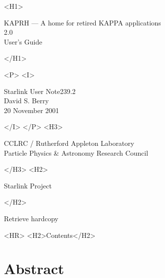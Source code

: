 \documentclass[twoside,11pt]{article}
\newcommand{\stardoccategory}  {Starlink User Note}
\newcommand{\stardocsource}    {sun239.2}
\newcommand{\stardocnumber}    {239.2}
\newcommand{\stardocauthors}   {David S. Berry}
\newcommand{\stardocdate}      {20 November 2001}
\newcommand{\stardoctitle}     {KAPRH ---  A home for retired KAPPA applications}
\newcommand{\stardocversion}   {2.0}
\newcommand{\stardocmanual}    {User's Guide}
\newcommand{\htmladdnormallink}[2]{#1}
\newcommand{\htmladdimg}[1]{}
\newcommand{\htmlref}[2]{#1}
\newcommand{\htmladdtonavigation}[1]{}
\newcommand{\xlabel}[1]{}
\newcommand{\latexonlytoc}[0]{\tableofcontents}
\begin{document}
\begin{htmlonly}
   \xlabel{}
   \begin{rawhtml} <H1> \end{rawhtml}
      \stardoctitle\\
      \stardocversion\\
      \stardocmanual
   \begin{rawhtml} </H1> \end{rawhtml}


   \begin{rawhtml} <P> <I> \end{rawhtml}
   \stardoccategory \stardocnumber \\
   \stardocauthors \\
   \stardocdate
   \begin{rawhtml} </I> </P> <H3> \end{rawhtml}
      \htmladdnormallink{CCLRC}{http://www.cclrc.ac.uk} /
      \htmladdnormallink{Rutherford Appleton Laboratory}
                        {http://www.cclrc.ac.uk/ral} \\
      \htmladdnormallink{Particle Physics \& Astronomy Research Council}
                        {http://www.pparc.ac.uk} \\
   \begin{rawhtml} </H3> <H2> \end{rawhtml}
      \htmladdnormallink{Starlink Project}{http://www.starlink.ac.uk/}
   \begin{rawhtml} </H2> \end{rawhtml}
   \htmladdnormallink{\htmladdimg{source.gif} Retrieve hardcopy}
      {http://www.starlink.ac.uk/cgi-bin/hcserver?\stardocsource}\\

  \label{stardoccontents}
  \begin{rawhtml}
    <HR>
    <H2>Contents</H2>
  \end{rawhtml}
  \renewcommand{\latexonlytoc}[0]{}
  \htmladdtonavigation{\htmlref{\htmladdimg{contents_motif.gif}}
        {stardoccontents}}

  \section{\xlabel{abstract}Abstract}
\end{htmlonly}
\end{document}
